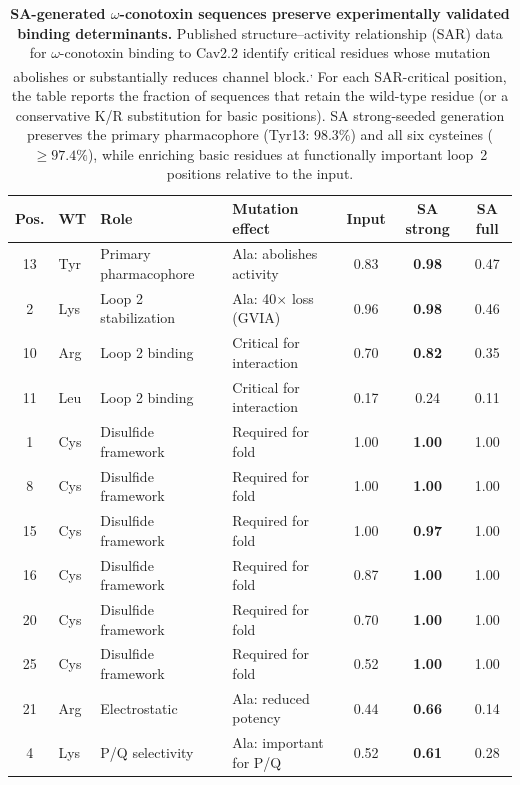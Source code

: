 \documentclass[journal=jcisd8,manuscript=article]{achemso}
\theoremstyle{definition}
\theoremstyle{remark}
\begin{document}
\begin{table}[p]
  \caption{\textbf{SA-generated $\omega$-conotoxin sequences preserve experimentally
  validated binding determinants.}
  Published structure--activity relationship (SAR) data for $\omega$-conotoxin
  binding to Cav2.2 identify critical residues whose mutation abolishes or
  substantially reduces channel block.\cite{kimTyr13Essential1995,satoBasicResidues1993,lewisConotoxinSAR2012}\textsuperscript{,}\cite{satoAlaScanMVIIC2000,schroederLys2Effects2012,schroederChiralityTyr131999}
  For each SAR-critical position, the table reports the fraction of sequences that
  retain the wild-type residue (or a conservative K/R substitution for basic positions).
  SA strong-seeded generation preserves the primary pharmacophore (Tyr13: 98.3\%)
  and all six cysteines ($\geq 97.4\%$), while enriching basic residues at
  functionally important loop~2 positions relative to the input.}
  \label{tab:sar-agreement}
  \centering
  \small
  \begin{tabular}{clllccc}
    \toprule
    Pos. & WT & Role & Mutation effect & Input & SA strong & SA full \\
    \midrule
    13 & Tyr & Primary pharmacophore & Ala: abolishes activity & 0.83 & \textbf{0.98} & 0.47 \\
    2  & Lys & Loop 2 stabilization  & Ala: 40$\times$ loss (GVIA) & 0.96 & \textbf{0.98} & 0.46 \\
    10 & Arg & Loop 2 binding        & Critical for interaction & 0.70 & \textbf{0.82} & 0.35 \\
    11 & Leu & Loop 2 binding        & Critical for interaction & 0.17 & 0.24 & 0.11 \\
    1  & Cys & Disulfide framework   & Required for fold & 1.00 & \textbf{1.00} & 1.00 \\
    8  & Cys & Disulfide framework   & Required for fold & 1.00 & \textbf{1.00} & 1.00 \\
    15 & Cys & Disulfide framework   & Required for fold & 1.00 & \textbf{0.97} & 1.00 \\
    16 & Cys & Disulfide framework   & Required for fold & 0.87 & \textbf{1.00} & 1.00 \\
    20 & Cys & Disulfide framework   & Required for fold & 0.70 & \textbf{1.00} & 1.00 \\
    25 & Cys & Disulfide framework   & Required for fold & 0.52 & \textbf{1.00} & 1.00 \\
    21 & Arg & Electrostatic          & Ala: reduced potency & 0.44 & \textbf{0.66} & 0.14 \\
    4  & Lys & P/Q selectivity       & Ala: important for P/Q & 0.52 & \textbf{0.61} & 0.28 \\
    \bottomrule
  \end{tabular}
\end{table}
\end{document}
